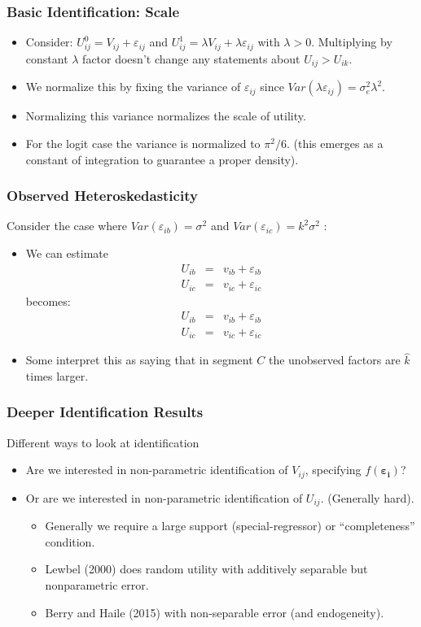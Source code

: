 \begin{frame}
\frametitle{Basic Identification: Scale}
\begin{itemize}
\item Consider: $U_{ij}^0 = V_{ij} + \varepsilon_{ij}$ and  $U_{ij}^1 = \lambda V_{ij} + \lambda \varepsilon_{ij}$ with $\lambda > 0$. Multiplying by constant $\lambda$ factor doesn't change any statements about $U_{ij} > U_{ik}$.
\item We normalize this by fixing the variance of $\varepsilon_{ij}$ since $Var(\lambda \varepsilon_{ij} ) = \sigma_e^2 \lambda^2$.
\item Normalizing this variance normalizes the scale of utility.
\item For the logit case the variance is normalized to $\pi^2/6$. (this emerges as a constant of integration to guarantee a proper density).
\end{itemize}
\end{frame}



\begin{frame}
\frametitle{Observed Heteroskedasticity}
Consider the case where $Var(\varepsilon_{ib}) = \sigma^2$ and   $Var(\varepsilon_{ic}) =  k^2 \sigma^2$ :
\begin{itemize}
\item We can estimate
\begin{eqnarray*}
U_{ib} &=& v_{ib}+ \varepsilon_{ib}\\
U_{ic} &=& v_{ic}+ \varepsilon_{ic}
\end{eqnarray*}
becomes:
\begin{eqnarray*}
U_{ib} &=& v_{ib}+ \varepsilon_{ib}\\
U_{ic} &=& v_{ic}+ \varepsilon_{ic}
\end{eqnarray*}
\item Some interpret this as saying that in segment $C$ the unobserved factors are $\hat{k}$ times larger.
\end{itemize}
\end{frame}

\begin{frame}
\frametitle{Deeper Identification Results}
Different ways to look at identification
\begin{itemize}
\item Are we interested in non-parametric identification of $V_{ij}$, specifying $f(\boldsymbol{\varepsilon_i})$?
\item Or are we interested in non-parametric identification of $U_{ij}$. (Generally hard).
\begin{itemize}
\item Generally we require a large support (special-regressor) or ``completeness'' condition.
\item Lewbel (2000) does random utility with additively separable but nonparametric error.\item Berry and Haile (2015) with non-separable error (and endogeneity).
\end{itemize}
\end{itemize}
\end{frame}


